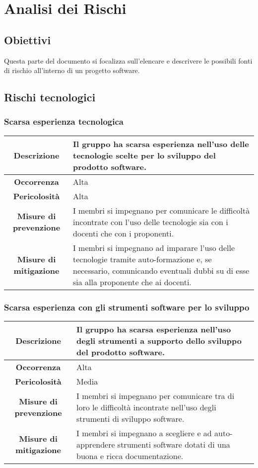 \section{Analisi dei Rischi}
\subsection{Obiettivi}
Questa parte del documento si focalizza sull'elencare e descrivere le possibili fonti di rischio all'interno di un progetto software.
\subsection{Rischi tecnologici}
\subsubsection{Scarsa esperienza tecnologica}
\begin{tabular}{|c|p{10cm}|}
\hline
\textbf{Descrizione} & Il gruppo ha scarsa esperienza nell'uso delle tecnologie scelte per lo sviluppo del prodotto software. \\
\hline
\textbf{Occorrenza} & Alta \\
\hline
\textbf{Pericolosità} & Alta \\
\hline
\textbf{Misure di prevenzione} & I membri si impegnano per comunicare le difficoltà incontrate con l'uso delle tecnologie sia con i docenti che con i proponenti. \\
\hline
\textbf{Misure di mitigazione} & I membri si impegnano ad imparare l'uso delle tecnologie tramite auto-formazione e, se necessario, comunicando eventuali dubbi su di esse sia alla proponente che ai docenti. \\
\hline
\end{tabular}

\subsubsection{Scarsa esperienza con gli strumenti software per lo sviluppo}
\begin{tabular}{|c|p{10cm}|}
\hline
\textbf{Descrizione} & Il gruppo ha scarsa esperienza nell'uso degli strumenti a supporto dello sviluppo del prodotto software. \\
\hline
\textbf{Occorrenza} & Alta \\
\hline
\textbf{Pericolosità} & Media \\
\hline
\textbf{Misure di prevenzione} & I membri si impegnano per comunicare tra di loro le difficoltà incontrate nell'uso degli strumenti di sviluppo software. \\
\hline
\textbf{Misure di mitigazione} & I membri si impegnano a scegliere e ad auto-apprendere strumenti software dotati di una buona e ricca documentazione.\\
\hline
\end{tabular}

